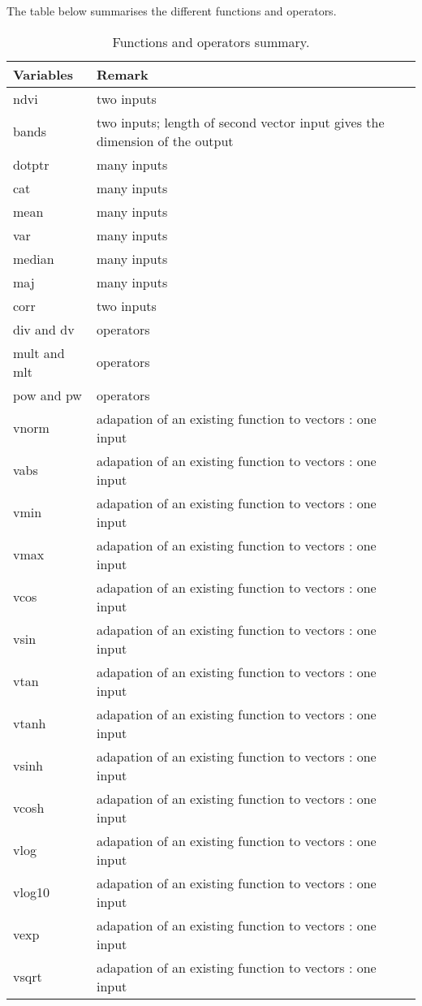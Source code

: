 The table below summarises the different functions and operators.


\begin{center}
\begin{table}
\begin{tabular}{||l|l||}
\hline
\bf Variables & \bf Remark \\
\hline\hline
ndvi &  two inputs\\
bands & two inputs; length of second vector input gives the dimension of the output \\
dotptr &  many inputs \\
cat & many inputs \\
mean & many inputs \\
var & many inputs \\
median & many inputs \\
maj & many inputs \\
corr & two inputs \\
div and dv &  operators \\
mult and mlt & operators \\
pow and pw  & operators \\
vnorm  & adapation of an existing function to vectors : one input \\
vabs   & adapation of an existing function to vectors : one input \\
vmin   & adapation of an existing function to vectors : one input \\
vmax   & adapation of an existing function to vectors : one input \\
vcos   & adapation of an existing function to vectors : one input \\
vsin   & adapation of an existing function to vectors : one input \\
vtan   & adapation of an existing function to vectors : one input \\
vtanh  & adapation of an existing function to vectors : one input \\
vsinh  & adapation of an existing function to vectors : one input \\
vcosh  & adapation of an existing function to vectors : one input \\
vlog   & adapation of an existing function to vectors : one input \\
vlog10 & adapation of an existing function to vectors : one input \\
vexp   & adapation of an existing function to vectors : one input \\
vsqrt  & adapation of an existing function to vectors : one input \\
\hline
\end{tabular}
\caption{Functions and operators summary.}
\label{bandmathOperators}
\end{table}
\end{center}



